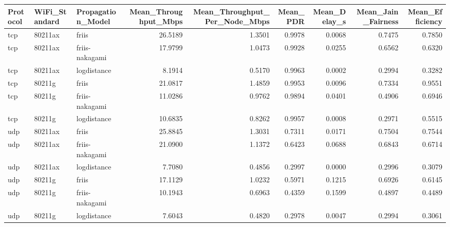 \begin{tabular}{lllrrrrrr}
\toprule
Protocol & WiFi_Standard & Propagation_Model & Mean_Throughput_Mbps & Mean_Throughput_Per_Node_Mbps & Mean_PDR & Mean_Delay_s & Mean_Jain_Fairness & Mean_Efficiency \\
\midrule
tcp & 80211ax & friis & 26.5189 & 1.3501 & 0.9978 & 0.0068 & 0.7475 & 0.7850 \\
tcp & 80211ax & friis-nakagami & 17.9799 & 1.0473 & 0.9928 & 0.0255 & 0.6562 & 0.6320 \\
tcp & 80211ax & logdistance & 8.1914 & 0.5170 & 0.9963 & 0.0002 & 0.2994 & 0.3282 \\
tcp & 80211g & friis & 21.0817 & 1.4859 & 0.9953 & 0.0096 & 0.7334 & 0.9551 \\
tcp & 80211g & friis-nakagami & 11.0286 & 0.9762 & 0.9894 & 0.0401 & 0.4906 & 0.6946 \\
tcp & 80211g & logdistance & 10.6835 & 0.8262 & 0.9957 & 0.0008 & 0.2971 & 0.5515 \\
udp & 80211ax & friis & 25.8845 & 1.3031 & 0.7311 & 0.0171 & 0.7504 & 0.7544 \\
udp & 80211ax & friis-nakagami & 21.0900 & 1.1372 & 0.6423 & 0.0688 & 0.6843 & 0.6714 \\
udp & 80211ax & logdistance & 7.7080 & 0.4856 & 0.2997 & 0.0000 & 0.2996 & 0.3079 \\
udp & 80211g & friis & 17.1129 & 1.0232 & 0.5971 & 0.1215 & 0.6926 & 0.6145 \\
udp & 80211g & friis-nakagami & 10.1943 & 0.6963 & 0.4359 & 0.1599 & 0.4897 & 0.4489 \\
udp & 80211g & logdistance & 7.6043 & 0.4820 & 0.2978 & 0.0047 & 0.2994 & 0.3061 \\
\bottomrule
\end{tabular}
